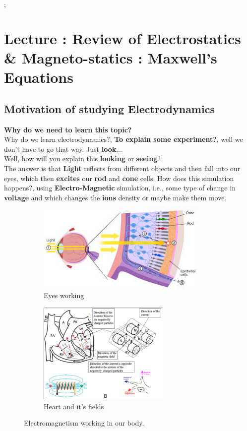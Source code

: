 \documentclass{article}
\newcommand{\lecture}[1]{
  \section{Lecture \thesection: #1}
}
\begin{document}
\tableofcontents \thispagesty{}
\pagebreak;

\lecture{Review of Electrostatics \& Magneto-statics : Maxwell's Equations}
\subsection{Motivation of studying Electrodynamics}
\textbf{Why do we need to learn this topic?}\\
Why do we learn electrodynamics?, \textbf{To explain some experiment?}, well we don't have to go that way. Just \textbf{look}...\\
Well, how will you explain this \textbf{looking} or \textbf{seeing}?\\
The answer is that \textbf{Light} reflects from different objects and then fall into our eyes, which then \textbf{excites} our \textbf{rod} and \textbf{cone} cells. How does this simulation happens?, using \textbf{Electro-Magnetic} simulation, i.e., some type of change in \textbf{voltage} and which changes the \textbf{ions} density or maybe make them move.
\begin{figure}[H]
    \centering
    \begin{subfigure}{0.4\textwidth}
        \includegraphics[width=0.9\textwidth]{Images/seeing.jpeg}
        \caption{Eyes working}
        \label{f1a}
    \end{subfigure}
    \hfill
    \begin{subfigure}{0.4\textwidth}
        \includegraphics[width=0.7\textwidth]{Images/Heart.png}
        \caption{Heart and it's fields}
        \label{f1b}
    \end{subfigure}
    \caption{Electromagnetism working in our body.}
    \label{fig:EM_example}
\end{figure}
\end{document}
